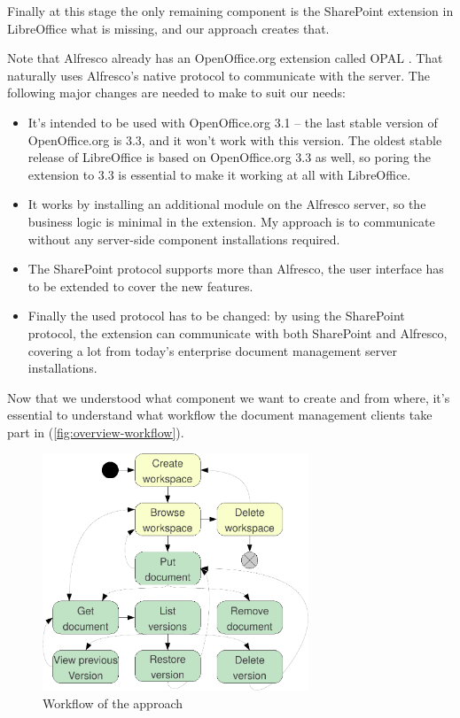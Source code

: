 Finally at this stage the only remaining component is the SharePoint extension
in LibreOffice what is missing, and our approach creates that.

Note that Alfresco already has an OpenOffice.org extension called
OPAL \cite{opal}. That naturally uses Alfresco's native protocol to communicate
with the server. The following major changes are needed to make to suit our
needs:

\begin{itemize}
\item It's intended to be used with OpenOffice.org 3.1 -- the last stable
version of OpenOffice.org is 3.3, and it won't work with this version. The
oldest stable release of LibreOffice is based on OpenOffice.org 3.3 as well, so
poring the extension to 3.3 is essential to make it working at all with
LibreOffice.
\item It works by installing an additional module on the Alfresco server, so
the business logic is minimal in the extension. My approach is to communicate
without any server-side component installations required.
\item The SharePoint protocol supports more than Alfresco, the user interface
has to be extended to cover the new features.
\item Finally the used protocol has to be changed: by using the SharePoint
protocol, the extension can communicate with both SharePoint and Alfresco,
covering a lot from today's enterprise document management server
installations.
\end{itemize}

Now that we understood what component we want to create and from where, it's
essential to understand what workflow the document management clients take part
in (\autoref{fig:overview-workflow}).

\begin{figure}[H]
\centering
\includegraphics[width=300px,keepaspectratio]{overview-workflow.pdf}
\caption{Workflow of the approach}
\label{fig:overview-workflow}
\end{figure}

